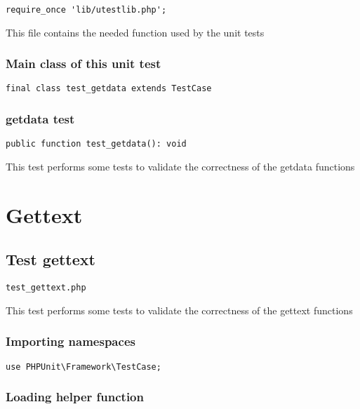 \documentclass[a4paper]{article}
\begin{document}
\begin{lstlisting}
require_once 'lib/utestlib.php';
\end{lstlisting}

This file contains the needed function used by the unit tests

\hypertarget{toc218}{}
\subsubsection{Main class of this unit test}

\begin{lstlisting}
final class test_getdata extends TestCase
\end{lstlisting}

\hypertarget{toc219}{}
\subsubsection{getdata test}

\begin{lstlisting}
public function test_getdata(): void
\end{lstlisting}

This test performs some tests to validate the correctness
of the getdata functions


\hypertarget{toc220}{}
\section{Gettext}

\hypertarget{toc221}{}
\subsection{Test gettext}

\begin{lstlisting}
test_gettext.php
\end{lstlisting}

This test performs some tests to validate the correctness
of the gettext functions

\hypertarget{toc222}{}
\subsubsection{Importing namespaces}

\begin{lstlisting}
use PHPUnit\Framework\TestCase;
\end{lstlisting}

\hypertarget{toc223}{}
\subsubsection{Loading helper function}
\end{document}
